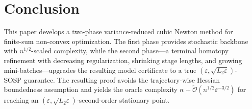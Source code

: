 \documentclass{article}
\theoremstyle{plain}
\theoremstyle{definition}
\theoremstyle{remark}
\begin{document}

\section{Conclusion}

This paper develops a two-phase variance-reduced cubic Newton method for finite-sum non-convex optimization. The first phase provides stochastic backbone with \(n^{1/2}\)-scaled complexity, while the second phase---a terminal homotopy refinement with decreasing regularization, shrinking stage lengths, and growing mini-batches---upgrades the resulting model certificate to a true \((\varepsilon,\sqrt{L_2\varepsilon})\)-SOSP guarantee. The resulting proof avoids the trajectory-wise Hessian boundedness assumption and yields the oracle complexity
$n+\widetilde{\mathcal O}\!\left(n^{1/2}\varepsilon^{-3/2}\right)$
for reaching an \((\varepsilon,\sqrt{L_2\varepsilon})\)-second-order stationary point.
\end{document}
